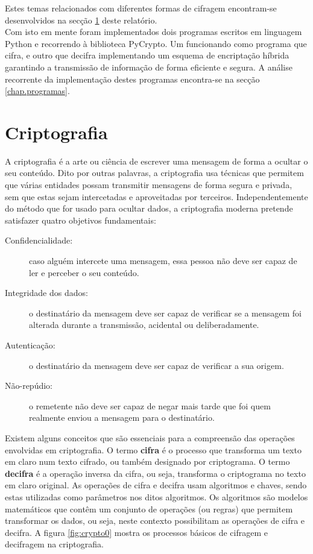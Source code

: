 \documentclass[a4paper,11pt,openright,oneside]{report}
\begin{document}
Estes temas relacionados com diferentes formas de cifragem encontram-se desenvolvidos na secção \ref{chap.criptografia} deste relatório.\\

Com isto em mente foram implementados dois programas escritos em linguagem Python e recorrendo à biblioteca PyCrypto. Um funcionando como programa que cifra, e outro que decifra implementando um esquema de encriptação híbrida garantindo a transmissão de informação de forma eficiente e segura. A análise recorrente da implementação destes programas encontra-se na secção \ref{chap.programas}.

\chapter{Criptografia}
\label{chap.criptografia}

A criptografia é a arte ou ciência de escrever uma mensagem de forma a ocultar o seu conteúdo. Dito por outras palavras, a criptografia usa técnicas que permitem que várias entidades possam transmitir mensagens de forma segura e privada, sem que estas sejam intercetadas e aproveitadas por terceiros. Independentemente do método que for usado para ocultar dados, a criptografia moderna pretende satisfazer quatro objetivos fundamentais:

\begin{description}
\item[Confidencialidade:] caso alguém intercete uma mensagem, essa pessoa não deve ser capaz de ler e perceber o seu conteúdo.
\item[Integridade dos dados:] o destinatário da mensagem deve ser capaz de verificar se a mensagem foi alterada durante a transmissão, acidental ou deliberadamente.
\item[Autenticação:] o destinatário da mensagem deve ser capaz de verificar a sua origem.
\item[Não-repúdio:] o remetente não deve ser capaz de negar mais tarde que foi quem realmente enviou a mensagem para o destinatário.
\end{description}

Existem alguns conceitos que são essenciais para a compreensão das operações envolvidas em criptografia. O termo \textbf{cifra} é o processo que transforma um texto em claro num texto cifrado, ou também designado por criptograma. O termo \textbf{decifra} é a operação inversa da cifra, ou seja, transforma o criptograma no texto em claro original. As operações de cifra e decifra usam algoritmos e chaves, sendo estas utilizadas como parâmetros nos ditos algoritmos. Os algoritmos são modelos matemáticos que contêm um conjunto de operações (ou regras) que permitem transformar os dados, ou seja, neste contexto possibilitam as operações de cifra e decifra. A figura \ref{fig:crypto0} mostra os processos básicos de cifragem e decifragem na criptografia.
\end{document}
